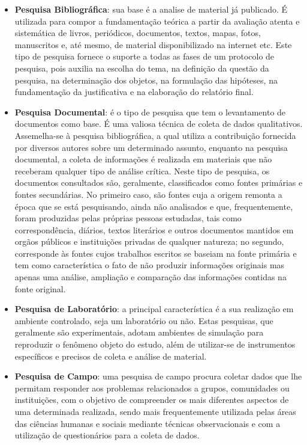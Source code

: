 \begin{itemize}
\item \textbf{Pesquisa Bibliográfica}: sua base é a analise de material já publicado. É utilizada para compor a fundamentação teórica a partir da avaliação atenta e sistemática de livros, periódicos, documentos, textos, mapas, fotos, manus\-critos e, até mesmo, de material disponibilizado na internet etc. Este tipo de pesquisa fornece o suporte a todas as fases de um protocolo de pesquisa, pois auxilia na escolha do tema, na definição da questão da pesquisa, na determinação dos objetos, na formulação das hipóteses, na fundamentação da justificativa e na elaboração do relatório final.

\newpage
\item \textbf{Pesquisa Documental}: é o tipo de pesquisa que tem o levantamento de documentos como base. É uma valiosa técnica de coleta de dados qualitativos. Assemelha-se à pesquisa bibliográfica, a qual utiliza a contribuição fornecida por diversos autores sobre um determinado assunto, enquanto na pesquisa documental, a coleta de informações é realizada em materiais que não receberam qualquer tipo de análise crítica. Neste tipo de pesquisa, os documentos consultados são, geralmente, classificados  como fontes pri\-márias e fontes secundárias. No primeiro caso, são fontes cuja a origem remonta a época que se está pesquisando, ainda não analisados e que, frequentemente, foram produzidas pelas próprias pessoas estudadas, tais como correspondência, diários, textos literários e outros documentos mantidos em orgãos públicos e instituições privadas de qualquer natureza; no segundo, corresponde às fontes cujos trabalhos escritos se baseiam na fonte primária e tem como característica o fato de não produzir informações originais mas apenas uma análise, ampliação e comparação das informações contidas na fonte original.
\item \textbf{Pesquisa de Laboratório}: a principal característica é a sua realização em ambiente controlado, seja um laboratório ou não. Estas pesquisas, que geralmente são experimentais, adotam ambientes de simulação para reproduzir o fenômeno objeto do estudo, além de utilizar-se de instrumentos específicos e precisos de coleta e análise de material.

\item \textbf{Pesquisa de Campo}: uma pesquisa de campo procura coletar dados que lhe permitam responder aos problemas relacionados a grupos, comunidades ou instituições, com o objetivo de compreender os mais diferentes aspectos de uma determinada realizada, sendo mais frequentemente utilizada pelas áreas das ciências humanas e sociais mediante técnicas observacionais e com a utilização de questionários para a coleta de dados. 
\end{itemize}

